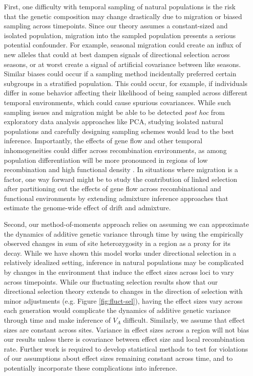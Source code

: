 \documentclass[11pt]{article}
\begin{document}
First, one difficulty with temporal sampling of natural populations is the risk
that the genetic composition may change drastically due to migration or biased
sampling across timepoints. Since our theory assumes a constant-sized and
isolated population, migration into the sampled population presents a serious
potential confounder. For example, seasonal migration could create an influx of
new alleles that could at best dampen signals of directional selection across
seasons, or at worst create a signal of artificial covariance between like
seasons. Similar biases could occur if a sampling method incidentally preferred
certain subgroups in a stratified population. This could occur, for example, if
individuals differ in some behavior affecting their likelihood of being sampled
across different temporal environments, which could cause spurious covariances.
While such sampling issues and migration might be able to be detected
\emph{post hoc} from exploratory data analysis approaches like PCA, studying
isolated natural populations and carefully designing sampling schemes would
lead to the best inference. Importantly, the effects of gene flow and other
temporal inhomogeneities could differ across recombination environments, as
among population differentiation will be more pronounced in regions of low
recombination and high functional density
\parencite{Keinan2010-ry,Burri2017-ml,Nachman2012-sw}. In situations where
  migration is a factor, one way forward might be to study the contribution of
  linked selection after partitioning out the effects of gene flow across
  recombinational and functional environments by extending admixture inference
approaches that estimate the genome-wide effect of drift and admixture.

Second, our method-of-moments approach relies on assuming we can approximate
the dynamics of additive genetic variance through time by using the empirically
observed changes in sum of site heterozygosity in a region as a proxy for its
decay. While we have shown this model works under directional selection in a
relatively idealized setting, inference in natural populations may be
complicated by changes in the environment that induce the effect sizes across
loci to vary across timepoints. While our fluctuating selection results show
that our directional selection theory extends to changes in the direction of
selection with minor adjustments (e.g. Figure \ref{fig:fluct-sel}), having the
effect sizes vary across each generation would complicate the dynamics of
additive genetic variance through time and make inference of $V_A$ difficult.
Similarly, we assume that effect sizes are constant across sites. Variance in
effect sizes across a region will not bias our results unless there is
covariance between effect size and local recombination rate. Further work is
required to develop statistical methods to test for violations of our
assumptions about effect sizes remaining constant across time, and to
potentially incorporate these complications into inference.
\end{document}
